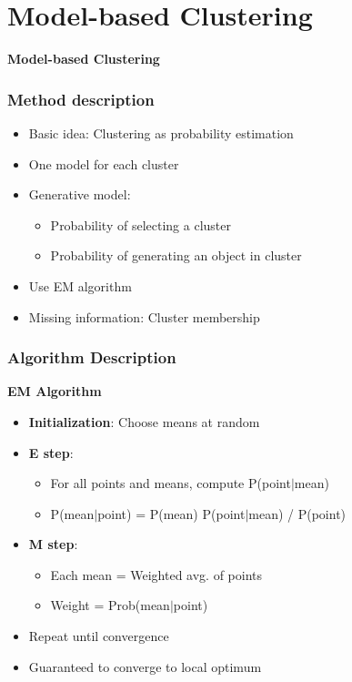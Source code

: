 \documentclass{beamer}
\begin{document}

\section{Model-based Clustering}
\begin{frame}
\begin{center}
\textbf{Model-based Clustering}
\end{center} 
\end{frame}
\begin{frame}
\frametitle{Method description}
\begin{center}
 \begin{itemize}
 \item Basic idea: Clustering as probability estimation
\item One model for each cluster
\item Generative model:
\begin{itemize}
\item Probability of selecting a cluster
\item Probability of generating an object in cluster
\end{itemize}
\item Use EM algorithm
\item Missing information: Cluster membership

 \end{itemize}
\end{center}
\end{frame}





\begin{frame}
\frametitle{Algorithm Description}
\textbf{EM Algorithm}
\begin{center}
  \begin{itemize}
  \item \textbf{Initialization}: Choose means at random
\item \textbf{E step}:
\begin{itemize}
\item For all points and means, compute P(point$|$mean)
\item P(mean$|$point) = P(mean) P(point$|$mean) / P(point)
\end{itemize}
\item \textbf{M step}:
\begin{itemize}
\item Each mean = Weighted avg. of points
\item Weight = Prob(mean$|$point)
\end{itemize}
\item Repeat until convergence
\item Guaranteed to converge to local optimum
\end{itemize}
\end{center}
\end{frame}
\end{document}
